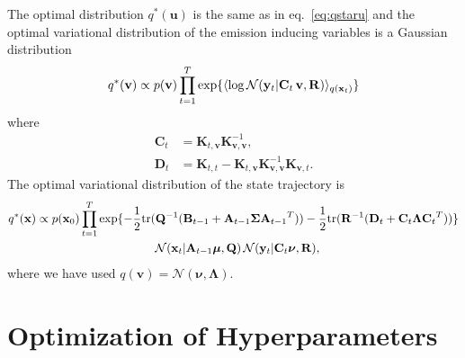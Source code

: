 \documentclass{article} %
\newcommand{\fix}{\marginpar{FIX}}
\newcommand{\n}[1]{\mathbf{#1}}
\newcommand{\x}{\mathbf{x}}
\newcommand{\y}{\mathbf{y}}
\newcommand{\bSigma}{\boldsymbol\Sigma}
\begin{document}
The optimal distribution $q^*(\n{u})$ is the same as in eq.~\eqref{eq:qstaru} and the optimal variational distribution of the emission inducing variables is a Gaussian distribution
\begin{equation}
q^{*}(\n{v}) \propto p(\n{v}) \prod_{t=1}^T \exp\{\langle \log \cN(\y_t |\n{C}_t \, \n{v}, \n{R}) \rangle_{q(\bx_t)} \} 
\end{equation}
where
\begin{align*}
\n{C}_t &= \n{K}_{t,\n{v}} \n{K}_{\n{v},\n{v}}^{-1}, \\
\n{D}_t &=  \n{K}_{t,t} - \n{K}_{t,\n{v}} \n{K}_{\n{v},\n{v}}^{-1} \n{K}_{\n{v},t}.
\end{align*}
The optimal variational distribution of the state trajectory is
\begin{align}
q^*(\bx) &\propto p(\x_0) \prod_{t=1}^T \exp\{-\frac{1}{2} {\rm tr} (\n{Q}^{-1} ({\n{B}_{t-1}} + {\n{A}_{t-1}} \bSigma {\n{A}_{t-1}}^T)) -\frac{1}{2} {\rm tr}( \n{R}^{-1} ({\n{D}_t} + {\n{C}_t} \boldsymbol\Lambda {\n{C}_t}^T))  \} \nn \\
&\qquad\qquad\qquad\qquad\qquad  \mathcal{N}(\x_t |\n{A}_{t-1} \bmu, \n{Q}) \, \mathcal{N}(\y_t |\n{C}_t \boldsymbol\nu, \n{R}),
\end{align}
where we have used $q(\n{v}) = \mathcal{N}(\boldsymbol\nu,\boldsymbol\Lambda)$.








\section{Optimization of Hyperparameters}
\end{document}
